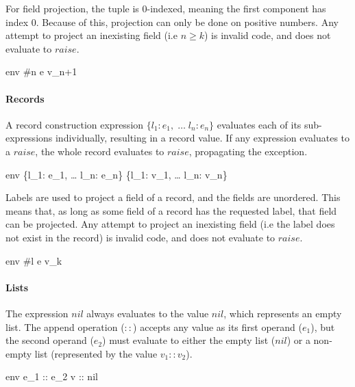\documentclass{article}
\begin{document}
For field projection, the tuple is 0-indexed, meaning the first component has index 0.
Because of this, projection can only be done on positive numbers.
Any attempt to project an inexisting field (i.e $n \geq k$) is invalid code, and does not evaluate to $raise$.

    {\mbox{env} \vdash \#n \; e \Downarrow v_{n+1}}

\paragraph{Records}
A record construction expression $\{l_1: e_1, \; \dots \; l_n: e_n\}$ evaluates each of its sub-expressions individually, resulting in a record value.
If any expression evaluates to a $raise$, the whole record evaluates to $raise$, propagating the exception.

    {\mbox{env} \vdash \{l_1: e_1, \; \dots \; l_n: e_n\} \Downarrow \{l_1: v_1, \; \dots \; l_n: v_n\}}

Labels are used to project a field of a record, and the fields are unordered.
This means that, as long as some field of a record has the requested label, that field can be projected.
Any attempt to project an inexisting field (i.e the label does not exist in the record) is invalid code, and does not evaluate to $raise$.

    {\mbox{env} \vdash \#l \; e \Downarrow v_k}


\paragraph{Lists}
The expression $nil$ always evaluates to the value $nil$, which represents an empty list.
The append operation ($::$) accepts any value as its first operand ($e_1$), but the second operand ($e_2$) must evaluate to either the empty list ($nil$) or a non-empty list (represented by the value $v_1 :: v_2$).


    {\mbox{env} \vdash e_1 :: e_2 \Downarrow v :: nil}
\end{document}
